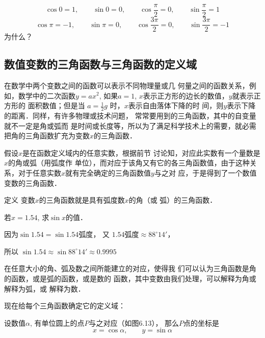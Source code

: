 \begin{example}
    $$\cos 0=1,\qquad \sin 0=0,\qquad \cos\frac{\pi}{2}=0,\qquad \sin\frac{\pi}{2}=1$$
    \[\cos\pi=-1,\qquad \sin\pi=0,\qquad \cos\frac{3\pi}{2}=0,\qquad \sin\frac{3\pi}{2}=-1\]
    为什么？
\end{example}

\subsection{数值变数的三角函数与三角函数的定义域}
在数学中两个变数之间的函数可以表示不同物理量或几
何量之间的函数关系，例如，数学中的二次函数$y=ax^2$,
如果$a=1$, $x$表示正方形的边长的数值，$y$就表示正方形的
面积数值；但是当
$a=\frac{1}{2}g$
时，$x$表示自由落体下降的时
间，则$y$表示下降的距离．同样，有许多物理或技术问题，
常常要用到的三角函数，其中的自变量就不一定是角或弧而
是时间或长度等，所以为了满足科学技术上的需要，就必需
把角的三角函数扩充为变数$x$的三角函数．

假设$x$是在函数定义域内的任意实数，根据前节
讨论知，对应此实数有一个量数是$x$的角或弧（用弧度作
单位），而对应于该角又有它的各三角函数值，由于这种关
系，对于任意实数$x$就有完全确定的三角函数值$y$与之对
应，于是得到了一个数值变数的三角函数．

\begin{blk}{定义}
 变数$x$的三角函数就是具有弧度数$x$的角（或
弧）的三角函数．    
\end{blk}


\begin{example}
    若$x=1.54$, 求$\sin x$的值．
\end{example}

\begin{solution}
    因为$\sin1.54=\sin1.54\text{弧度}$，
又 $1.54\text{弧度}\approx 88^{\circ}14'$，

所以
$\sin1.54\approx \sin88^{\circ}14'\approx 0.9995$
\end{solution}

在任意大小的角、弧及数之间所能建立的对应，使得我
们可以认为三角函数是角的函数，或是弧的函数，或是数的
函数，其中变数由我们处理，可以解释为角或解释为弧，或
解释为数．

现在给每个三角函数确定它的定义域：

设数值$\alpha$, 有单位圆上的点$P$与之对应（如图6.13），
那么$P$点的坐标是
\[x=\cos\alpha,\qquad y=\sin\alpha\]

\begin{figure}[htp]
    \centering
{}
    \caption{}
\end{figure}


